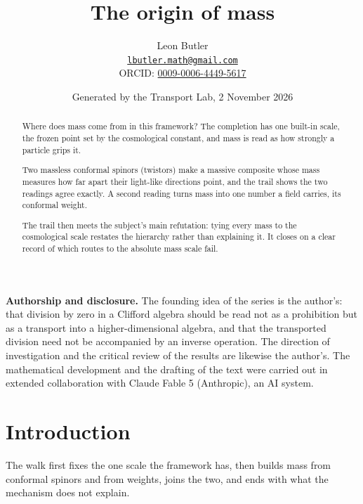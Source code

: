 \documentclass[11pt]{article}
\title{\bfseries The origin of mass}
\author{Leon Butler\\ \normalsize\href{mailto:lbutler.math@gmail.com}{\texttt{lbutler.math@gmail.com}}\\ \normalsize ORCID: \href{https://orcid.org/0009-0006-4449-5617}{0009-0006-4449-5617}}
\date{Generated by the Transport Lab, 2 November 2026}
\theoremstyle{definition}
\theoremstyle{plain}
\begin{document}
\maketitle
\begin{abstract}
\normalsize
Where does mass come from in this framework? The completion has one built-in scale, the frozen point set by the cosmological constant, and mass is read as how strongly a particle grips it.

Two massless conformal spinors (twistors) make a massive composite whose mass measures how far apart their light-like directions point, and the trail shows the two readings agree exactly. A second reading turns mass into one number a field carries, its conformal weight.

The trail then meets the subject's main refutation: tying every mass to the cosmological scale restates the hierarchy rather than explaining it. It closes on a clear record of which routes to the absolute mass scale fail.
\end{abstract}
\newpage
\noindent \textbf{Authorship and disclosure. }The founding idea of the series is the author's: that division by zero in a Clifford algebra should be read not as a prohibition but as a transport into a higher-dimensional algebra, and that the transported division need not be accompanied by an inverse operation. The direction of investigation and the critical review of the results are likewise the author's. The mathematical development and the drafting of the text were carried out in extended collaboration with Claude Fable 5 (Anthropic), an AI system.

\noindent{}
\newpage

\section*{Introduction}
The walk first fixes the one scale the framework has, then builds mass from conformal spinors and from weights, joins the two, and ends with what the mechanism does not explain.
\end{document}
